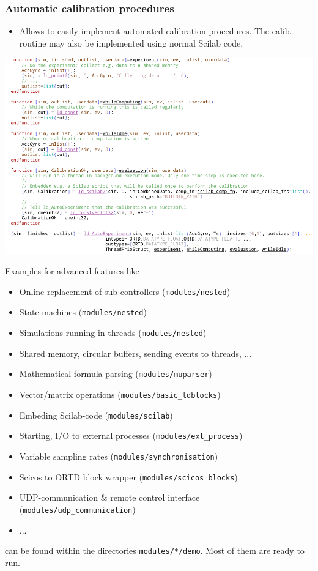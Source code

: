 \documentclass[serif,9pt,xcolor=dvipsnames]{beamer}
\begin{document}
\begin{frame}
  \frametitle{Automatic calibration procedures}
  \begin{itemize}
    \item Allows to easily implement automated calibration procedures. The calib. routine may also be implemented using normal Scilab code.
  \end{itemize}
  \centering \includegraphics[width=1\linewidth]{figures/Autocalibration_crop.pdf} 

\end{frame}



\begin{frame}
Examples for advanced features like 

  \begin{itemize}
\item Online replacement of sub-controllers (\texttt{modules/nested})
\item State machines (\texttt{modules/nested})
\item Simulations running in threads (\texttt{modules/nested})
\item Shared memory, circular buffers, sending events to threads, ...
\item Mathematical formula parsing (\texttt{modules/muparser})
\item Vector/matrix operations (\texttt{modules/basic\_ldblocks})
\item Embeding Scilab-code (\texttt{modules/scilab})
\item Starting, I/O to external processes (\texttt{modules/ext\_process})
\item Variable sampling rates (\texttt{modules/synchronisation})
\item Scicos to ORTD block wrapper (\texttt{modules/scicos\_blocks})
\item UDP-communication \& remote control interface (\texttt{modules/udp\_communication})
\item ...
  \end{itemize}

  can be found within the directories \texttt{modules/*/demo}. Most of them are ready to run.
\end{frame}
\end{document}
